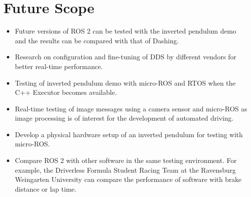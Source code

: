 \documentclass[%
xelatex,
	oneside,		%
	12pt,			%
	parskip=half,	%
	abstracton,
	chapterprefix=true%
    appendixprefix=true]
{scrbook}
\begin{document}
\section{Future Scope}
\vspace*{0.5cm}
\begin{itemize}
\item Future versions of ROS 2 can be tested with the inverted pendulum demo and the results can be compared with that of Dashing.
\item Research on configuration and fine-tuning of DDS by different vendors for better real-time performance. 
\item Testing of inverted pendulum demo with micro-ROS and RTOS when the C++ Executor becomes available.
\item Real-time testing of image messages using a camera sensor and micro-ROS as image processing is of interest for the development of automated driving.
\item Develop a physical hardware setup of an inverted pendulum for testing with micro-ROS.
\item Compare ROS 2 with other software in the same testing environment. For example, the Driverless Formula Student Racing Team at the Ravensburg Weingarten University can compare the performance of software with brake distance or lap time.
\end{itemize}
	\listoffigures
	\listoftables
		
		

\end{document}
